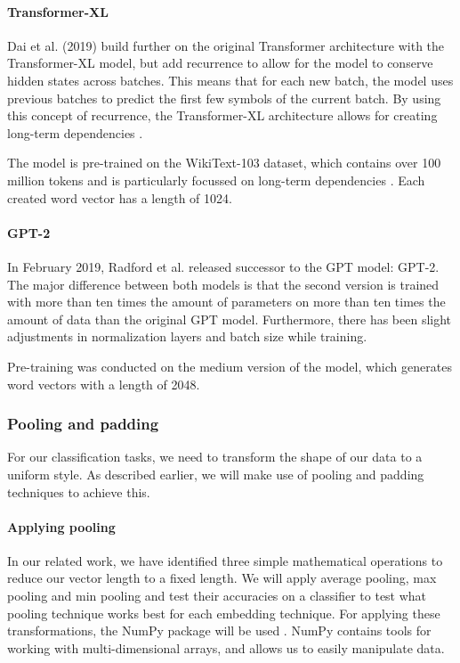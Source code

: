 \paragraph{Transformer-XL}
Dai et al. (2019) build further on the original Transformer architecture with the Transformer-XL model, but add recurrence to allow for the model to conserve hidden states across batches.
This means that for each new batch, the model uses previous batches to predict the first few symbols of the current batch.
By using this concept of recurrence, the Transformer-XL architecture allows for creating long-term dependencies \nocite{dai2019}. 

The model is pre-trained on the WikiText-103 dataset, which contains over 100 million tokens and is particularly focussed on long-term dependencies \cite{merity2017}. 
Each created word vector has a length of 1024. 

\paragraph{GPT-2}
In February 2019, Radford et al. released successor to the GPT model: GPT-2\nocite{radford2019}. 
The major difference between both models is that the second version is trained with more than ten times the amount of parameters on more than ten times the amount of data than the original GPT model.
Furthermore, there has been slight adjustments in normalization layers and batch size while training. 

Pre-training was conducted on the medium version of the model, which generates word vectors with a length of 2048. 

\subsubsection{Pooling and padding}
For our classification tasks, we need to transform the shape of our data to a uniform style.
As described earlier, we will make use of pooling and padding techniques to achieve this.

\paragraph{Applying pooling}
In our related work, we have identified three simple mathematical operations to reduce our vector length to a fixed length.
We will apply average pooling, max pooling and min pooling and test their accuracies on a classifier to test what pooling technique works best for each embedding technique.
For applying these transformations, the NumPy package will be used \cite{numpy}.
NumPy contains tools for working with multi-dimensional arrays, and allows us to easily manipulate data. 

